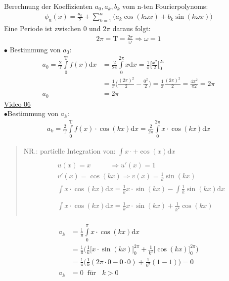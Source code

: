 Berechnung der Koeffizienten $ a_0, a_k, b_k $ vom n-ten Fourierpolynoms:\\
\begin{align*}
\phi_n(x)=\frac{a_0}{2}+\sum\limits_{k=1}^{n}\big(a_k\cos(k\omega x)+b_k\sin(k\omega x)\big)
\end{align*}
Eine Periode ist zwischen 0 und $ 2\pi $ daraus folgt:\\
\begin{align*}
2\pi=\mathrm{T}=\frac{2\pi}{\omega}\Rightarrow \omega=1
\end{align*}
$ \bullet $\; Bestimmung von $ a_0 $:\\
\begin{align*}
a_0=\frac{2}{\mathrm{T}}\int\limits_{0}^{\mathrm{T}} f(x)\mathrm{d}x&=\frac{2}{2\pi}\int\limits_{0}^{2\pi} x\mathrm{d}x=\frac{1}{\pi}\bigg[\frac{x^2}{2}\bigg]^{2\pi}_0\\
&=\frac{1}{\pi}\bigg(\frac{(2\pi)^2}{2}-\frac{0^2}{2}\bigg)=\frac{1}{\pi}\frac{(2\pi)^2}{2}=\frac{4\pi^2}{\pi2}=2\pi\\
a_0&=2\pi
\end{align*}
\href{https://youtu.be/i4RYWjoYFAA}{Video 06}\\
$ \bullet $\;Bestimmung von $ a_k $:
\begin{align*}
a_k=\frac{2}{\mathrm{T}}\int\limits_{0}^{\mathrm{T}} f(x)\cdot \cos(kx)\mathrm{d}x=\frac{2}{2\pi}\int\limits_{0}^{2\pi} x\cdot \cos(kx)\mathrm{d}x
\end{align*}
\begin{quote}
	NR.: partielle Integration von: $ \int\limits_{}^{} x\cdot +\cos(x)\mathrm{d}x $\\
	\begin{align*}
	&u(x)=x\;\;\;\;\;\;\;\;\;\;\Rightarrow u'(x)=1\\
	&v'(x)=\cos(kx)\Rightarrow v(x)=\frac{1}{k}\sin(kx)\\
	&\int\limits_{}^{}x\cdot \cos(kx)\mathrm{d}x=\frac{1}{k}x\cdot \sin(kx)-\int\limits_{}^{} \frac{1}{k}\sin(kx)\mathrm{d}x\\
	&\int\limits_{}^{}x\cdot \cos(kx)\mathrm{d}x=\frac{1}{k}x\cdot \sin(kx)+\frac{1}{k^2}\cos(kx)
	\end{align*}
\end{quote}
\begin{align*}
a_k&=\frac{1}{\pi}\int\limits_{0}^{\pi} x\cdot \cos(kx)\mathrm{d}x\\
&=\frac{1}{\pi}\bigg( \frac{1}{k}\bigg[x\cdot \sin(kx)\bigg]^{2\pi}_0+\frac{1}{k^2}\bigg[\cos(kx)\bigg]^{2\pi}_0\bigg)\\
&=\frac{1}{\pi}\bigg(\frac{1}{k}(2\pi\cdot 0-0\cdot 0)+\frac{1}{k^2}(1-1)\bigg)=0\\
a_k&=0\;\;\text{für }\;\;k>0
\end{align*}
